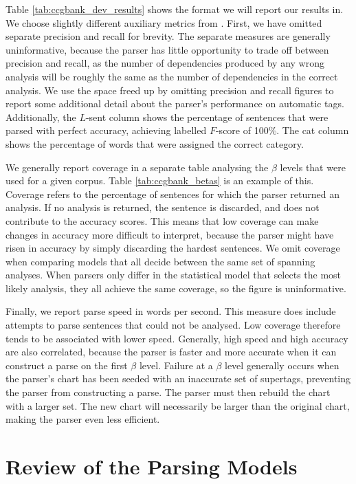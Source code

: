 Table \ref{tab:ccgbank_dev_results} shows the format we will report our results
in. We choose slightly different auxiliary metrics from \citeauthor{clark:cl07}.
First, we have omitted separate precision and recall for brevity. The separate
measures are generally uninformative, because the parser has little opportunity
to trade off between precision and recall, as the number of dependencies
produced by any wrong analysis will be roughly the same as the number of
dependencies in the correct analysis. We use the space freed up by omitting
precision and recall figures to report some additional detail about the parser's
performance on automatic \pos tags. Additionally, the $L$-sent column shows the
percentage of sentences that were parsed with perfect accuracy, achieving
labelled $F$-score of 100\%. The cat column shows the percentage of words that
were assigned the correct category.

We generally report coverage in a separate table analysing the $\beta$ levels
that were used for a given corpus. Table \ref{tab:ccgbank_betas} is an example
of this. Coverage refers to the percentage of sentences for which the parser
returned an analysis. If no analysis is returned, the sentence is discarded, and
does not contribute to the accuracy scores. This means that low coverage can
make changes in accuracy more difficult to interpret, because the parser might
have risen in accuracy by simply discarding the hardest sentences. We omit
coverage when comparing models that all decide between the same set of spanning
analyses. When parsers only differ in the statistical model that selects the
most likely analysis, they all achieve the same coverage, so the figure is
uninformative.

Finally, we report parse speed in words per second. This measure does include
attempts to parse sentences that could not be analysed. Low coverage therefore
tends to be associated with lower speed. Generally, high speed and high accuracy
are also correlated, because the parser is faster and more accurate when it can
construct a parse on the first $\beta$ level. Failure at a $\beta$ level
generally occurs when the parser's chart has been seeded with an inaccurate set
of supertags, preventing the parser from constructing a parse. The parser must
then rebuild the chart with a larger set. The new chart will necessarily be
larger than the original chart, making the parser even less efficient.

\section{Review of the \candc Parsing Models}

